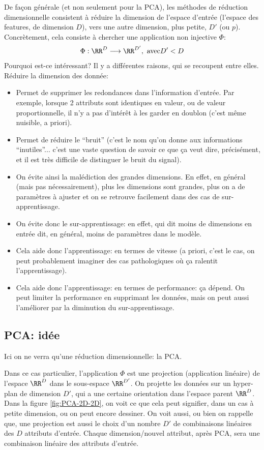 \documentclass[french,twoside]{article}
\begin{document}
De façon générale (et non seulement pour la PCA), les méthodes de réduction dimensionnelle consistent à réduire la dimension de l'espace d'entrée (l'espace des features, de dimension $D$), vers une autre dimension, plus petite, $D'$ (ou $p$).
Concrètement, cela consiste à chercher une application non injective $\Phi$:
\begin{align}
\Phi: \RR^D \longrightarrow \RR^{D'},  \text{ avec} D'<D
\end{align}
Pourquoi est-ce intéressant?
Il y a différentes raisons, qui se recoupent entre elles. 
Réduire la dimension des donnée:
\begin{itemize}
\item Permet de supprimer les redondances dans l'information d'entrée. Par exemple, lorsque 2 attributs sont identiques en valeur, ou de valeur proportionnelle, il n'y a pas d'intérêt à les garder en doublon (c'est même nuisible, a priori).
\item Permet de réduire le ``bruit'' (c'est le nom qu'on donne aux informations ``inutiles''... c'est une vaste question de savoir ce que ça veut dire, précisément, et il est très difficile de distinguer le bruit du signal).
\item On évite ainsi la malédiction des grandes dimensions. En effet, en général (mais pas nécessairement), plus les dimensions sont grandes, plus on a de paramètres à ajuster et on se retrouve facilement dans des cas de sur-apprentissage.
\item On évite donc le sur-apprentissage: en effet, qui dit moins de dimensions en entrée dit, en général, moins de paramètres dans le modèle.
\item Cela aide donc l'apprentissage: en termes de vitesse (a priori, c'est le cas, on peut probablement imaginer des cas pathologiques où ça ralentit l'apprentissage).
\item Cela aide donc l'apprentissage: en termes de performance: ça dépend. On peut limiter la performance en supprimant les données, mais on peut aussi l'améliorer par la diminution du sur-apprentissage.
\end{itemize}

\subsection{PCA: idée}

Ici on ne verra qu'une réduction dimensionnelle: la PCA.

Dans ce cas particulier, l'application $\Phi$ est une projection (application linéaire) de l'espace $\RR^D$ dans le sous-espace $\RR^{D'}$. On projette les données sur un hyper-plan de dimension $D'$, qui a une certaine orientation dans l'espace parent $\RR^D$. 
Dans la figure \ref{fig:PCA-2D-2D}, on voit ce que cela peut signifier, dans un cas à petite dimension, ou on peut encore dessiner.
On voit aussi, ou bien on rappelle que, une projection est aussi le choix d'un nombre $D'$ de combinaisons linéaires des $D$ attributs d'entrée. Chaque dimension/nouvel attribut, après PCA, sera une combinaison linéaire des attributs d'entrée.
\end{document}

